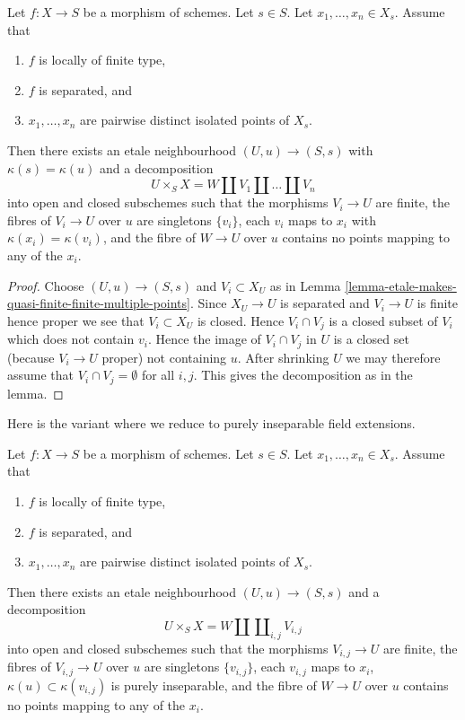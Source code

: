 \begin{lemma}
\label{lemma-etale-splits-off-quasi-finite-part-technical}
Let $f : X \to S$ be a morphism of schemes.
Let $s \in S$. Let $x_1, \ldots, x_n \in X_s$. Assume that
\begin{enumerate}
\item $f$ is locally of finite type,
\item $f$ is separated, and
\item $x_1, \ldots, x_n$ are pairwise distinct isolated points of $X_s$.
\end{enumerate}
Then there exists an etale neighbourhood $(U, u) \to (S, s)$
with $\kappa(s) = \kappa(u)$ and a decomposition
$$
U \times_S X = W \coprod V_1 \coprod \ldots \coprod V_n
$$
into open and closed subschemes such that the morphisms
$V_i \to U$ are finite, the fibres of $V_i \to U$ over $u$ are
singletons $\{v_i\}$, each $v_i$ maps to $x_i$ with
$\kappa(x_i) = \kappa(v_i)$, and the fibre of $W \to U$
over $u$ contains no points mapping to any of the $x_i$.
\end{lemma}

\begin{proof}
Choose $(U, u) \to (S, s)$ and $V_i \subset X_U$ as in
Lemma \ref{lemma-etale-makes-quasi-finite-finite-multiple-points}.
Since $X_U \to U$ is separated and $V_i \to U$ is finite
hence proper we see that $V_i \subset X_U$ is closed.
Hence $V_i \cap V_j$ is a closed subset of $V_i$ which
does not contain $v_i$. Hence the image of $V_i \cap V_j$
in $U$ is a closed set (because $V_i \to U$ proper) not
containing $u$. After shrinking $U$ we may therefore assume
that $V_i \cap V_j = \emptyset$ for all $i, j$. This gives the
decomposition as in the lemma.
\end{proof}

\noindent
Here is the variant where we reduce to purely inseparable
field extensions.

\begin{lemma}
\label{lemma-etale-splits-off-quasi-finite-part-technical-variant}
Let $f : X \to S$ be a morphism of schemes.
Let $s \in S$. Let $x_1, \ldots, x_n \in X_s$. Assume that
\begin{enumerate}
\item $f$ is locally of finite type,
\item $f$ is separated, and
\item $x_1, \ldots, x_n$ are pairwise distinct isolated points of $X_s$.
\end{enumerate}
Then there exists an etale neighbourhood $(U, u) \to (S, s)$
and a decomposition
$$
U \times_S X =
W \coprod
\coprod\nolimits_{i, j}
V_{i, j}
$$
into open and closed subschemes such that the morphisms
$V_{i, j} \to U$ are finite, the fibres of $V_{i, j} \to U$ over $u$ are
singletons $\{v_{i, j}\}$, each $v_{i, j}$ maps to $x_i$,
$\kappa(u) \subset \kappa(v_{i, j})$ is purely inseparable,
and the fibre of $W \to U$ over $u$ contains no points mapping
to any of the $x_i$.
\end{lemma}


